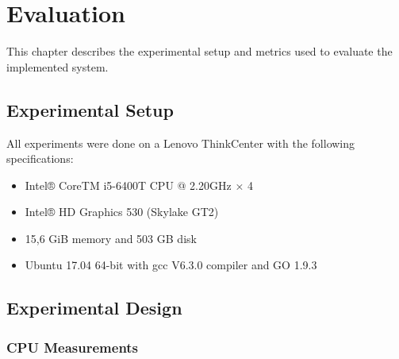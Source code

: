 \documentclass[USenglish]{uit-thesis}
\begin{document}
\chapter{Evaluation}
This chapter describes the experimental setup and metrics used to evaluate the implemented system.

\section{Experimental Setup}
All experiments were done on a Lenovo ThinkCenter with the following specifications:

\begin{itemize} 
\item Intel® CoreTM i5-6400T CPU @ 2.20GHz × 4
\item Intel® HD Graphics 530 (Skylake GT2)
\item 15,6 GiB memory and 503 GB disk
\item Ubuntu 17.04 64-bit with gcc V6.3.0 compiler and GO 1.9.3
\end{itemize}


\section{Experimental Design}



\subsection{CPU Measurements}
\end{document}
